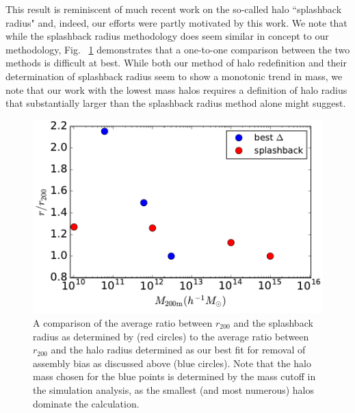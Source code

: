 \documentclass[usenatbib,fleqn]{mnras}
\begin{document}
This result is reminiscent of much recent work on the so-called halo ``splashback radius" \citep{more_etal15} and, indeed, our efforts were partly motivated by this work. We note that while the splashback radius methodology does seem similar in concept to our methodology, Fig. ~\ref{fig:splashback_compare} demonstrates that a one-to-one comparison between the two methods is difficult
at best. While both our method of halo redefinition and their determination of splashback radius seem to show a
monotonic trend in mass, we note that our work with the lowest mass halos requires a definition of halo radius
that substantially larger than the splashback radius method alone might suggest.

\begin{figure}
	\centering
	\includegraphics[width=.4\textwidth]{test_splashback.pdf}
	\caption{A comparison of the average ratio between $r_{200}$ and the splashback radius as determined by
	 \citet{more_etal15} (red circles) to the average ratio between $r_{200}$ and the halo radius determined as our
	  best fit for removal of assembly bias as discussed above (blue circles). Note that the halo mass chosen for
	  the blue points is determined by the mass cutoff in the simulation analysis, as the smallest (and most
	  numerous) halos dominate the calculation.}
	\label{fig:splashback_compare}
\end{figure}
\end{document}
